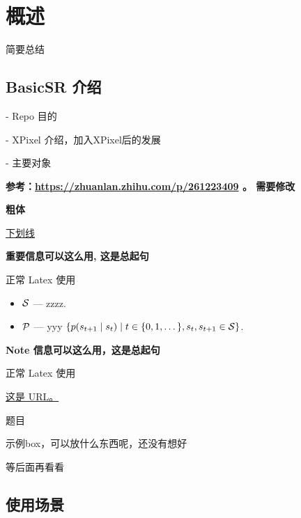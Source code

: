 \documentclass[../main.tex]{subfiles}
\begin{document}
\chapter{概述}
\vspace{-2cm}

简要总结

\section{BasicSR 介绍}

- Repo 目的

- XPixel 介绍，加入XPixel后的发展

- 主要对象

\textbf{参考：\url{https://zhuanlan.zhihu.com/p/261223409} 。 需要修改}

\textbf{粗体}

\uline{下划线}
\newline



\begin{hl} %
	\textbf{重要信息可以这么用, 这是总起句}
	
	正常 Latex 使用
	\begin{itemize}
		\item $\mathcal{S}$ --- zzzz.
		\item $\mathcal{P}$ --- yyy $\{p(s_{t+1} \HM\mid s_t) \HM\mid t \HM\in \{0, 1, \dots \}, s_t, s_{t+1} \HM\in \St\}$.
	\end{itemize}
\end{hl}

\begin{note} %
	\textbf{Note 信息可以这么用，这是总起句}
	
	正常 Latex 使用
	
	\href{http://xxx.com}{这是 URL。}
\end{note}

\begin{exampleBox}[righthand ratio=0.35, sidebyside, sidebyside align=center, lower separated=false]{题目}
	
	示例box，可以放什么东西呢，还没有想好
	
	等后面再看看
\end{exampleBox}

\section{使用场景}
\end{document}
